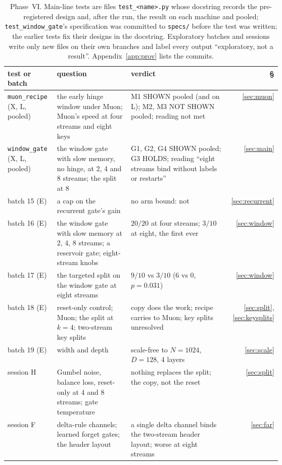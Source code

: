 \documentclass[11pt]{article}
\begin{document}
\begin{table}[h]
\centering
\footnotesize
\setlength{\tabcolsep}{4pt}
\begin{tabular}{@{}l>{\raggedright\arraybackslash}p{0.27\linewidth}>{\raggedright\arraybackslash}p{0.36\linewidth}r@{}}
\toprule
test or batch & question & verdict & \S\\
\midrule
\texttt{muon\_recipe} (X, L, pooled) & the early hinge window under Muon; Muon's speed at four streams and eight keys & M1 SHOWN pooled (and on L); M2, M3 NOT SHOWN pooled; reading not met & \ref{sec:muon}\\
\texttt{window\_gate} (X, L, pooled) & the window gate with slow memory, no hinge, at 2, 4 and 8 streams; the split at 8 & G1, G2, G4 SHOWN pooled; G3 HOLDS; reading ``eight streams bind without labels or restarts'' & \ref{sec:main}\\
\midrule
batch 15 (E) & a cap on the recurrent gate's gain & no arm bound: not & \ref{sec:recurrent}\\
batch 16 (E) & the window gate with slow memory at 2, 4, 8 streams; a reservoir gate; eight-stream knobs & $20/20$ at four streams; $3/10$ at eight, the first ever & \ref{sec:window}\\
batch 17 (E) & the targeted split on the window gate at eight streams & $9/10$ vs $3/10$ (6 vs 0, $p = 0.031$) & \ref{sec:window}\\
batch 18 (E) & reset-only control; Muon; the split at $k = 4$; two-stream key splits & copy does the work; recipe carries to Muon; key splits unresolved & \ref{sec:split}, \ref{sec:keysplits}\\
batch 19 (E) & width and depth & scale-free to $N = 1024$, $D = 128$, 4 layers & \ref{sec:scale}\\
session H & Gumbel noise, balance loss, reset-only at 4 and 8 streams; gate temperature & nothing replaces the split; the copy, not the reset & \ref{sec:split}\\
session F & delta-rule channels; learned forget gates; the header layout & a single delta channel binds the two-stream header layout; worse at eight streams & \ref{sec:far}\\
\bottomrule
\end{tabular}
\caption{Phase~VI. Main-line tests are files \texttt{test\_<name>.py} whose docstring records the pre-registered design and, after the run, the result on each machine and pooled; \texttt{test\_window\_gate}'s specification was committed to \texttt{specs/} before the test was written; the earlier tests fix their designs in the docstring. Exploratory batches and sessions write only new files on their own branches and label every output ``exploratory, not a result''. Appendix~\ref{app:prov} lists the commits.}
\label{tab:index}
\end{table}
\end{document}

